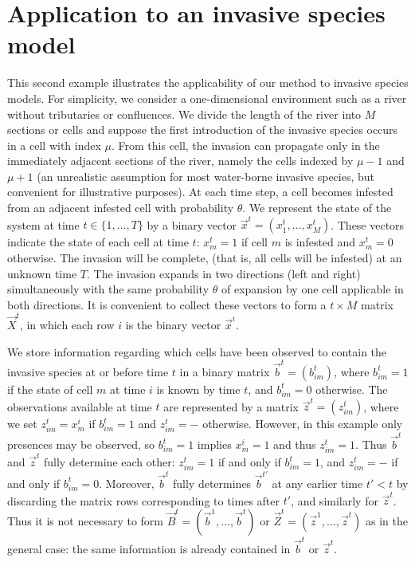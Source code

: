 \section{Application to an invasive species model}
\label{sec:7}

This second example illustrates the applicability of our method to invasive species models. For simplicity, we consider a one-dimensional environment such as a river without tributaries or confluences. We divide the length of the river into $M$ sections or cells and suppose the first introduction of the invasive species occurs in a cell with index $\mu$. From this cell, the invasion can propagate only in the immediately adjacent sections of the river, namely the cells indexed by $\mu-1$ and $\mu+1$ (an unrealistic assumption for most water-borne invasive species, but convenient for illustrative purposes). At each time step, a cell becomes infested from an adjacent infested cell with probability $\theta$. We represent the state of the system at time $t \in \{ 1, \dots, T \}$ by a binary vector $\vec{x}^{t} = (x_1^{t}, \dots, x_{M}^{t})$. These vectors indicate the state of each cell at time $t$: $x_m^t = 1$ if cell $m$ is infested and $x_m^t = 0$ otherwise. The invasion will be complete, (that is, all cells will be infested) at an unknown time $T$. 
The invasion expands in two directions (left and right) simultaneously with the same probability $\theta$ of expansion by one cell applicable in both directions. It is convenient to collect these vectors to form a $t\times M$ matrix $\vec{X}^{t}$, in which each row $i$ is the binary vector $\vec{x}^{i}$.

We store information regarding which cells have been observed to contain the invasive species at or before time $t$ in a binary matrix $\vec{b}^t = (b_{im}^t)$, where $b_{im}^t = 1$ if the state of cell $m$ at time $i$ is known by time $t$, and $b_{im}^t = 0$ otherwise. The observations available at time $t$ are represented by a matrix $\vec{z}^t = (z_{im}^t)$, where we set $z_{im}^t = x^i_m$ if $b_{im}^t = 1$ and $z_{im}^t = -$ otherwise. However, in this example only presences may be observed, so $b_{im}^t = 1$ implies $x_m^i = 1$ and thus $z_{im}^t = 1$. Thus $\vec{b}^t$ and $\vec{z}^t$ fully determine each other: $z_{im}^t = 1$ if and only if $b_{im}^t = 1$, and $z_{im}^t = -$ if and only if $b_{im}^t = 0$. Moreover, $\vec{b}^t$ fully determines $\vec{b}^{t'}$ at any earlier time $t' < t$ by discarding the matrix rows corresponding to times after $t'$, and similarly for $\vec{z}^t$. Thus it is not necessary to form $\vec{B}^t = (\vec{b}^1,\ldots,\vec{b}^t)$ or $\vec{Z}^t = (\vec{z}^1,\ldots,\vec{z}^t)$ as in the general case: the same information is already contained in $\vec{b}^t$ or $\vec{z}^t$.

